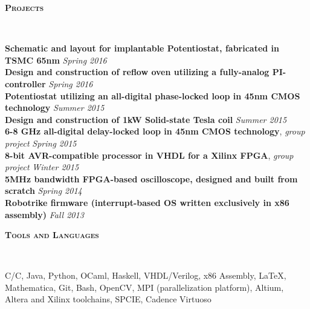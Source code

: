\documentclass{article}
\newenvironment{changemargin}[2]{%
  \begin{list}{}{%
    \setlength{\topsep}{0pt}%
    \setlength{\leftmargin}{#1}%
    \setlength{\rightmargin}{#2}%
    \setlength{\listparindent}{\parindent}%
    \setlength{\itemindent}{\parindent}%
    \setlength{\parsep}{\parskip}%
  }%
  \item[]}{\end{list}
}
\newcommand{\lineover}{
	\begin{changemargin}{-0.05in}{-0.05in}
		\vspace*{-8pt}
		\hrulefill \\
		\vspace*{-2pt}
	\end{changemargin}
}
\newcommand{\header}[1]{
	\begin{changemargin}{-.5in}{-0.5in}
		{\large \textbf{\scshape{#1}}}\\
  	\lineover
	\end{changemargin}
}
\newenvironment{body} {
	\vspace*{-16pt}
	\begin{changemargin}{-0.25in}{-0.5in}
  }	
	{\end{changemargin}
}
\newcommand{\CC}{C\nolinebreak\hspace{-.05em}\raisebox{.4ex}{\tiny\bf +}\nolinebreak\hspace{-.10em}\raisebox{.4ex}{\tiny\bf +}}
\begin{document}
\header{Projects}
\begin{body}
	\vspace{14pt}
	\textbf{Schematic and layout for implantable Potentiostat, fabricated in TSMC 65nm} \hfill \emph{Spring 2016}\\
	\textbf{Design and construction of reflow oven utilizing a fully-analog PI-controller} \hfill \emph{Spring 2016}\\
	\textbf{Potentiostat utilizing an all-digital phase-locked loop in 45nm CMOS technology} \hfill \emph{Summer 2015}\\
	\textbf{Design and construction of 1kW Solid-state Tesla coil} \hfill \emph{Summer 2015} \\
	\textbf{6-8 GHz all-digital delay-locked loop in 45nm CMOS technology}, \emph{group project} \hfill \emph{Spring 2015}\\
	\textbf{8-bit AVR-compatible processor in VHDL for a Xilinx FPGA}, \emph{group project} \hfill \emph{Winter 2015}\\
	\textbf{5MHz bandwidth FPGA-based oscilloscope, designed and built from scratch} \hfill \emph{Spring 2014}\\
	\textbf{Robotrike firmware (interrupt-based OS written exclusively in x86 assembly)} \hfill \emph{Fall 2013}\\
\end{body}

\medskip

\header{Tools and Languages}

\begin{body}
	\vspace{14pt}
	C/\CC, Java, Python, OCaml, Haskell, VHDL/Verilog, x86 Assembly, \LaTeX, Mathematica, Git, Bash, OpenCV, MPI (parallelization platform), Altium, Altera and Xilinx toolchains, SPCIE, Cadence Virtuoso
\end{body}
\end{document}
